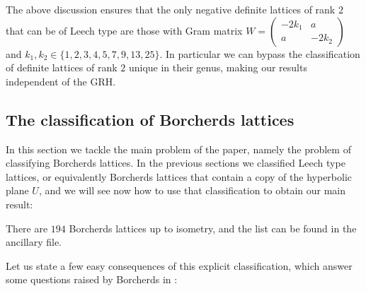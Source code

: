 \documentclass[11pt,letterpaper]{amsart}
\begin{document}
The above discussion ensures that the only negative definite lattices of rank $2$ that can be of Leech type are those with Gram matrix $
W=\begin{pmatrix}
-2k_1 &a\\
a &-2k_2
\end{pmatrix}
$ and $k_1,k_2\in \{1,2,3,4,5,7,9,13,25\}$. In particular we can bypass the classification of definite lattices of rank $2$ unique in their genus, making our results independent of the GRH.


\subsection{The classification of Borcherds lattices}

In this section we tackle the main problem of the paper, namely the problem of classifying Borcherds lattices. In the previous sections we classified Leech type lattices, or equivalently Borcherds lattices that contain a copy of the hyperbolic plane $U$, and we will see now how to use that classification to obtain our main result:

\begin{theorem} \label{thm:classification.Borcherds.lattices}
There are $194$ Borcherds lattices up to isometry, and the list can be found in the ancillary file.
\end{theorem}

Let us state a few easy consequences of this explicit classification, which answer some questions raised by Borcherds in \cite{borcherds.leech}:
\end{document}
